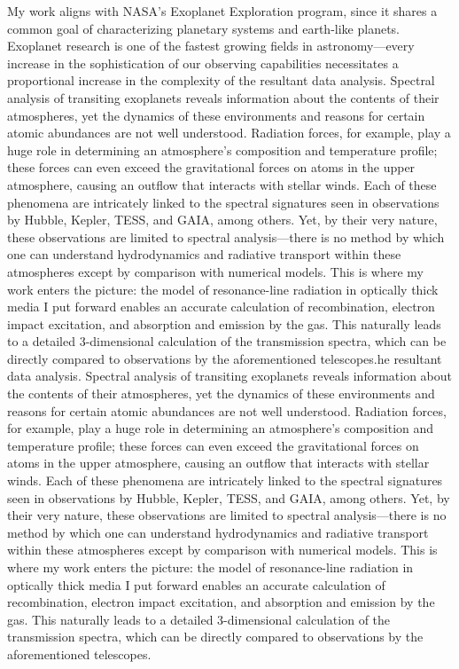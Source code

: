 \documentclass[]{article}
\begin{document}
\thispagestyle{empty}

My work aligns with NASA's Exoplanet Exploration program, since it shares a common goal of characterizing planetary systems and earth-like planets. Exoplanet research is one of the fastest growing fields in astronomy---every increase in the sophistication of our observing capabilities necessitates a proportional increase in the complexity of the resultant data analysis. Spectral analysis of transiting exoplanets reveals information about the contents of their atmospheres, yet the dynamics of these environments and reasons for certain atomic abundances are not well understood. Radiation forces, for example, play a huge role in determining an atmosphere's composition and temperature profile; these forces can even exceed the gravitational forces on atoms in the upper atmosphere, causing an outflow that interacts with stellar winds. Each of these phenomena are intricately linked to the spectral signatures seen in observations by Hubble, Kepler, TESS, and GAIA, among others. Yet, by their very nature, these observations are limited to spectral analysis---there is no method by which one can understand hydrodynamics and radiative transport within these atmospheres except by comparison with numerical models. This is where my work enters the picture: the model of resonance-line radiation in optically thick media I put forward enables an accurate calculation of recombination, electron impact excitation, and absorption and emission by the gas. This naturally leads to a detailed 3-dimensional calculation of the transmission spectra, which can be directly compared to observations by the aforementioned telescopes.he resultant data analysis. Spectral analysis of transiting exoplanets reveals information about the contents of their atmospheres, yet the dynamics of these environments and reasons for certain atomic abundances are not well understood. Radiation forces, for example, play a huge role in determining an atmosphere's composition and temperature profile; these forces can even exceed the gravitational forces on atoms in the upper atmosphere, causing an outflow that interacts with stellar winds. Each of these phenomena are intricately linked to the spectral signatures seen in observations by Hubble, Kepler, TESS, and GAIA, among others. Yet, by their very nature, these observations are limited to spectral analysis---there is no method by which one can understand hydrodynamics and radiative transport within these atmospheres except by comparison with numerical models. This is where my work enters the picture: the model of resonance-line radiation in optically thick media I put forward enables an accurate calculation of recombination, electron impact excitation, and absorption and emission by the gas. This naturally leads to a detailed 3-dimensional calculation of the transmission spectra, which can be directly compared to observations by the aforementioned telescopes.
\end{document}
